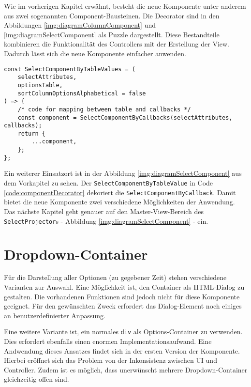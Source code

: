 Wie im vorherigen Kapitel erwähnt, besteht die neue Komponente unter anderem aus zwei sogenannten Component-Bausteinen.
Die Decorator sind in den Abbildungen \ref{img:diagramColumnComponent} und \ref{img:diagramSelectComponent} als Puzzle dargestellt.
Diese Bestandteile kombinieren die Funktionalität des Controllers mit der Erstellung der View.
Dadurch lässt sich die neue Komponente einfacher anwenden.

\begin{lstlisting}[style = htmlcssjs, caption = \texttt{SelectComponentByTableValue} dekoriert \texttt{SelectComponentByCallback}, label = code:componentDecorator]
const SelectComponentByTableValues = (
    selectAttributes,
    optionsTable,
    sortColumnOptionsAlphabetical = false
) => {
    /* code for mapping between table and callbacks */
    const component = SelectComponentByCallbacks(selectAttributes, callbacks);
    return {
        ...component,
    };
};
\end{lstlisting}

Ein weiterer Einsatzort ist in der Abbildung \ref{img:diagramSelectComponent} aus dem Vorkapitel zu sehen. 
Der \texttt{SelectComponentByTableValue} in Code \ref{code:componentDecorator} dekoriert die \texttt{SelectComponentByCallback}.
Damit bietet die neue Komponente zwei verschiedene Möglichkeiten der Anwendung.
Das nächste Kapitel geht genauer auf den Master-View-Bereich des \texttt{SelectProjector}s - Abbildung \ref{img:diagramSelectComponent} - ein. 


\section{Dropdown-Container}
\label{sec:dropdownContainer}

Für die Darstellung aller Optionen (zu gegebener Zeit) stehen verschiedene Varianten zur Auswahl.
Eine Möglichkeit ist, den Container als HTML-Dialog zu gestalten.
Die vorhandenen Funktionen sind jedoch nicht für diese Komponente geeignet.
Für den gewünschten Zweck erfordert das Dialog-Element noch einiges an benutzerdefinierter Anpassung.

Eine weitere Variante ist, ein normales \texttt{div} als Options-Container zu verwenden.
Dies erfordert ebenfalls einen enormen Implementationsaufwand.
Eine Andwendung dieses Ansatzes findet sich in der ersten Version der Komponente.
Hierbei eröffnet sich das Problem von der Inkonsistenz zwischen UI und Controller.
Zudem ist es möglich, dass unerwünscht mehrere Dropdown-Container gleichzeitig offen sind.


